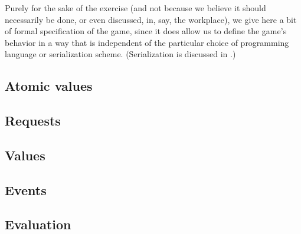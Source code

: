 Purely for the sake of the exercise (and not because we believe it
should necessarily be done, or even discussed, in, say, the
workplace), we give here a bit of formal specification of the game,
since it does allow us to define the game's behavior in a way that is
independent of the particular choice of programming language or
serialization scheme. (Serialization is discussed
in .)

\subsection{Atomic values}
\label{sec:play-formal:atomic}


\subsection{Requests}
\label{sec:play-formal:requests}


\subsection{Values}
\label{sec:play-formal:value_msgs}


\subsection{Events}
\label{sec:play-formal:events}


\subsection{Evaluation}
\label{sec:play-formal:eval}

